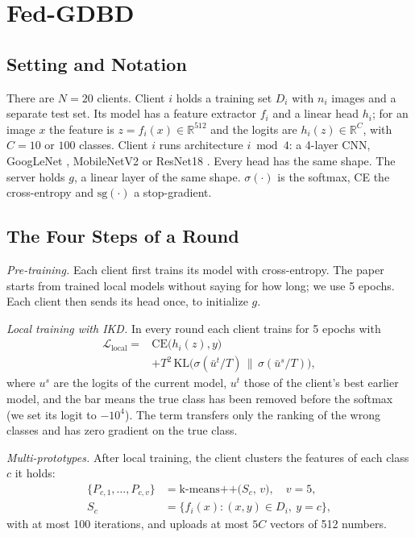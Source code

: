 \documentclass[conference]{IEEEtran}
\begin{document}
\section{Fed-GDBD}
\label{sec:method}

\subsection{Setting and Notation}
There are $N=20$ clients. Client $i$ holds a training set $D_i$ with $n_i$ images and a separate test set. Its model has a feature extractor $f_i$ and a linear head $h_i$; for an image $x$ the feature is $z=f_i(x)\in\mathbb{R}^{512}$ and the logits are $h_i(z)\in\mathbb{R}^C$, with $C=10$ or $100$ classes. Client $i$ runs architecture $i \bmod 4$: a 4-layer CNN, GoogLeNet \cite{szegedy2015googlenet}, MobileNetV2 \cite{sandler2018mobilenetv2} or ResNet18 \cite{he2016resnet}. Every head has the same shape. The server holds $g$, a linear layer of the same shape. $\sigma(\cdot)$ is the softmax, CE the cross-entropy and $\mathrm{sg}(\cdot)$ a stop-gradient.

\subsection{The Four Steps of a Round}
\textit{Pre-training.} Each client first trains its model with cross-entropy. The paper starts from trained local models without saying for how long; we use 5 epochs. Each client then sends its head once, to initialize $g$.

\textit{Local training with IKD.} In every round each client trains for 5 epochs with
\begin{equation}
\begin{split}
\mathcal{L}_{\text{local}} = {}&\mathrm{CE}\big(h_i(z), y\big)\\
&+ T^2\,\mathrm{KL}\big(\sigma(\bar{u}^{t}/T)\,\big\|\,\sigma(\bar{u}^{s}/T)\big),
\end{split}
\label{eq:local}
\end{equation}
where $u^s$ are the logits of the current model, $u^t$ those of the client's best earlier model, and the bar means the true class has been removed before the softmax (we set its logit to $-10^4$). The term transfers only the ranking of the wrong classes and has zero gradient on the true class.

\textit{Multi-prototypes.} After local training, the client clusters the features of each class $c$ it holds:
\begin{equation}
\begin{split}
\{P_{c,1},\dots,P_{c,v}\} &= \text{k-means++}\big(S_c,\, v\big),\quad v=5,\\
S_c &= \{f_i(x) : (x,y)\in D_i,\ y=c\},
\end{split}
\label{eq:protos}
\end{equation}
with at most 100 iterations, and uploads at most $5C$ vectors of 512 numbers.
\end{document}
